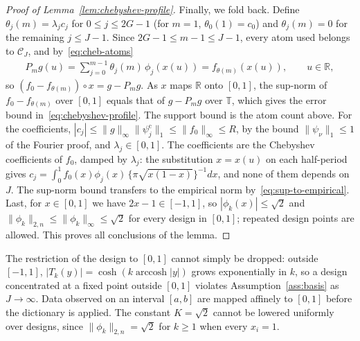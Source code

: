 \begin{proof}[Proof of Lemma~\ref{lem:chebyshev-profile}]
Finally, we fold back. Define $\theta_j(m)=\lambda_jc_j$ for $0\leq j\leq2G-1$ (for $m=1$, $\theta_0(1)=c_0$) and $\theta_j(m)=0$ for the remaining $j\leq J-1$. Since $2G-1\leq m-1\leq J-1$, every atom used belongs to $\mathcal C_J$, and by~\eqref{eq:cheb-atoms}
\begin{align*}
P_mg(u)=\sum_{j=0}^{m-1}\theta_j(m)\,\phi_j(x(u))=f_{\theta(m)}(x(u)),
\qquad u\in\mathbb R,
\end{align*}
so $(f_0-f_{\theta(m)})\circ x=g-P_mg$. As $x$ maps $\mathbb R$ onto $[0,1]$, the sup-norm of $f_0-f_{\theta(m)}$ over $[0,1]$ equals that of $g-P_mg$ over $\mathbb T$, which gives the error bound in~\eqref{eq:chebyshev-profile}. The support bound is the atom count above. For the coefficients, $|c_j|\leq\|g\|_\infty\|\psi^{\mathrm c}_j\|_1\leq\|f_0\|_\infty\leq R$, by the bound $\|\psi_\nu\|_1\leq1$ of the Fourier proof, and $\lambda_j\in[0,1]$. The coefficients are the Chebyshev coefficients of $f_0$, damped by $\lambda_j$: the substitution $x=x(u)$ on each half-period gives $c_j=\int_0^1f_0(x)\phi_j(x)\,\{\pi\sqrt{x(1-x)}\}^{-1}dx$, and none of them depends on $J$. The sup-norm bound transfers to the empirical norm by~\eqref{eq:sup-to-empirical}. Last, for $x\in[0,1]$ we have $2x-1\in[-1,1]$, so $|\phi_k(x)|\leq\sqrt2$ and $\|\phi_k\|_{2,n}\leq\|\phi_k\|_\infty\leq\sqrt2$ for every design in $[0,1]$; repeated design points are allowed. This proves all conclusions of the lemma.
\end{proof}

The restriction of the design to $[0,1]$ cannot simply be dropped: outside $[-1,1]$, $|T_k(y)|=\cosh(k\operatorname{arccosh}|y|)$ grows exponentially in $k$, so a design concentrated at a fixed point outside $[0,1]$ violates Assumption~\ref{ass:basis} as $J\to\infty$. Data observed on an interval $[a,b]$ are mapped affinely to $[0,1]$ before the dictionary is applied. The constant $K=\sqrt2$ cannot be lowered uniformly over designs, since $\|\phi_k\|_{2,n}=\sqrt2$ for $k\geq1$ when every $x_i=1$.

